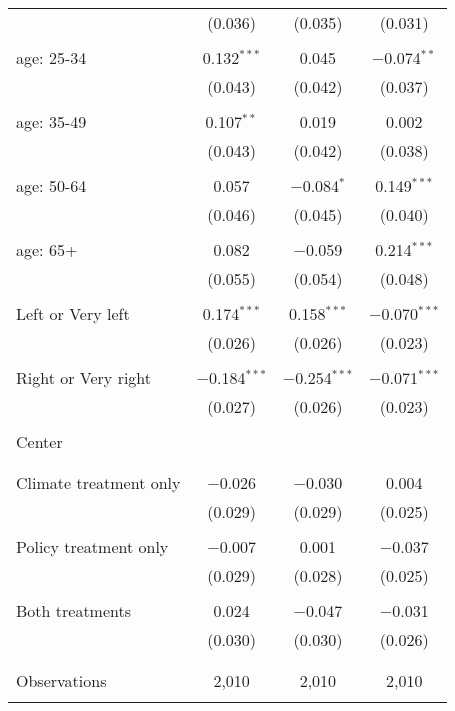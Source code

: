 \begin{tabular}{@{\extracolsep{5pt}}lccc}
  & (0.036) & (0.035) & (0.031) \\ 
  & & & \\ 
 age: 25-34 & 0.132$^{***}$ & 0.045 & $-$0.074$^{**}$ \\ 
  & (0.043) & (0.042) & (0.037) \\ 
  & & & \\ 
 age: 35-49 & 0.107$^{**}$ & 0.019 & 0.002 \\ 
  & (0.043) & (0.042) & (0.038) \\ 
  & & & \\ 
 age: 50-64 & 0.057 & $-$0.084$^{*}$ & 0.149$^{***}$ \\ 
  & (0.046) & (0.045) & (0.040) \\ 
  & & & \\ 
 age: 65+ & 0.082 & $-$0.059 & 0.214$^{***}$ \\ 
  & (0.055) & (0.054) & (0.048) \\ 
  & & & \\ 
 Left or Very left & 0.174$^{***}$ & 0.158$^{***}$ & $-$0.070$^{***}$ \\ 
  & (0.026) & (0.026) & (0.023) \\ 
  & & & \\ 
 Right or Very right & $-$0.184$^{***}$ & $-$0.254$^{***}$ & $-$0.071$^{***}$ \\ 
  & (0.027) & (0.026) & (0.023) \\ 
  & & & \\ 
 Center &  &  &  \\ 
  &  &  &  \\ 
  & & & \\ 
 Climate treatment only & $-$0.026 & $-$0.030 & 0.004 \\ 
  & (0.029) & (0.029) & (0.025) \\ 
  & & & \\ 
 Policy treatment only & $-$0.007 & 0.001 & $-$0.037 \\ 
  & (0.029) & (0.028) & (0.025) \\ 
  & & & \\ 
 Both treatments & 0.024 & $-$0.047 & $-$0.031 \\ 
  & (0.030) & (0.030) & (0.026) \\ 
  & & & \\ 
\hline \\[-1.8ex] 

Observations & 2,010 & 2,010 & 2,010 \\ 
\hline 
\hline \\[-1.8ex] 
\end{tabular} 